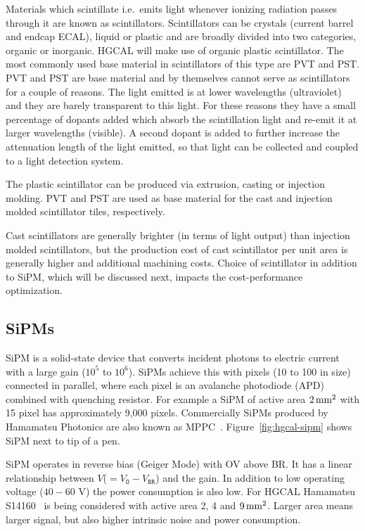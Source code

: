 Materials which scintillate i.e.~emits light
whenever ionizing radiation passes through it are known as
scintillators. Scintillators can be crystals (current barrel and endcap
\gls{ECAL}), liquid or plastic and are broadly divided into two
categories, organic or inorganic.
\gls{HGCAL} will make use of organic plastic scintillator. The most
commonly used base material in scintillators of this type are \gls{PVT} and \gls{PST}.
\gls{PVT} and \gls{PST} are base material and
by themselves cannot serve as scintillators for a couple of
reasons. The light emitted is at lower wavelengths (ultraviolet)
and they are barely transparent to this light.
For these reasons they have a small percentage of dopants added
which absorb the scintillation light and re-emit it at larger wavelengths (visible).
A second dopant is added to further increase the attenuation length of
the light emitted, so that light can be collected and coupled to a light
detection system.

The plastic scintillator can be produced via extrusion, casting or injection molding.
\gls{PVT} and \gls{PST} are used as base material for the cast and
injection molded scintillator tiles, respectively.

Cast scintillators are generally brighter (in terms of light output)
than injection molded scintillators, but the production cost of
cast scintillator per unit area is generally higher and additional
machining costs.
Choice of scintillator in addition to \gls{SiPM}, which will be discussed next,
impacts the cost-performance optimization.

\subsection{
  SiPMs
}

\gls{SiPM} is a solid-state device that converts incident photons to electric
current with a large gain (\( 10^5 \) to \( 10^6 \)).
\glspl{SiPM} achieve this with pixels (10\micron{} to 100\micron{} in size)
connected in parallel, where each pixel is an avalanche photodiode (APD)
combined with quenching resistor. For example a \gls{SiPM} of active
area \( 2\,\text{mm}{}^2 \) with 15\micron{} pixel has approximately 9,000 pixels.
Commercially \glspl{SiPM} produced by Hamamatsu Photonics are also known as \gls{MPPC}~\cite{mppc-13360}. Figure~\ref{fig:hgcal-sipm}
shows \gls{SiPM} next to tip of a pen.

\gls{SiPM} operates in reverse bias (Geiger Mode) with \gls{OV} above \gls{BR}.
It has a linear relationship between \(V\)(\(= V_{\texttt{O}} - V_{\texttt{BR}} \)) and the gain.
In addition to low operating voltage (\(40-60\) V) the power
consumption is also low.
For \gls{HGCAL} Hamamatsu S14160~\cite{mppc-14160} is being considered with
active area 2, 4 and \(9\,\text{mm}{}^2\). Larger area means larger signal, but
also higher intrinsic noise and power consumption.

